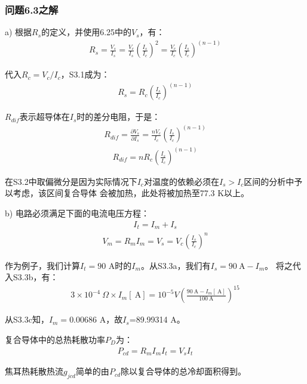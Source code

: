 \subsubsection{问题6.3之解}
a) 根据$R_s$的定义，并使用6.25中的$V_s$，有：
\begin{align*}%
R_s=\frac{V_s}{I_s}=\frac{V_c}{I_s}(\frac{I_s}{I_c})^2=\frac{V_c}{I_c}(\frac{I_s}{I_c})^{(n-1)} \tag{S3.1}
\end{align*}

代入$R_c=V_c/I_c$，S3.1成为：
\begin{align*}%
R_s=R_c(\frac{I_s}{I_c})^{(n-1)} \tag{6.26a}
\end{align*}

$R_{dif}$表示超导体在$I_s$时的差分电阻，于是：
\begin{align*}%
R_{dif}=\frac{\partial V_s}{\partial I_s}=\frac{nV_c}{I_c}(\frac{I_s}{I_c})^{(n-1)} \tag{S3.2}
\end{align*}
\begin{align*}%
R_{dif}=nR_c(\frac{I_s}{I_c})^{(n-1)} \tag{6.26a}
\end{align*}

在S3.2中取偏微分是因为实际情况下$I_c$对温度的依赖必须在$I_s>I_c$区间的分析中予以考虑，该区间复合导体
会被加热，此处将被加热至77.3 K以上。

b) 电路必须满足下面的电流电压方程：
\begin{align*}%
I_t=I_m+I_s \tag{S3.3a}
\end{align*}
\begin{align*}%
V_m=R_mI_m=V_s=V_c(\frac{I_s}{I_c})^{n} \tag{S3.3b}
\end{align*}

作为例子，我们计算$I_t=90$ A时的$I_m$。从S3.3a，我们有$I_s=90\ \mathrm{A}-I_m$。
将之代入S3.3b，有：
\begin{align*}%
3\times 10^{-4}\ \Omega\times I_m[\ \mathrm{A}]=10^{-5}V(\frac{90\ \mathrm{A}-I_m[\ \mathrm{A}]}{100\ \mathrm{A}})^{15} \tag{S3.3c}
\end{align*}

从S3.3c知，$I_m=$0.00686 A，故$I_s$=89.99314 A。

复合导体中的总热耗散功率$P_D$为：
\begin{align*}%
P_{cd}=R_mI_mI_t=V_sI_t \tag{S3.4}
\end{align*}

焦耳热耗散热流$g_{jcd}$简单的由$P_{cd}$除以复合导体的总冷却面积得到。


